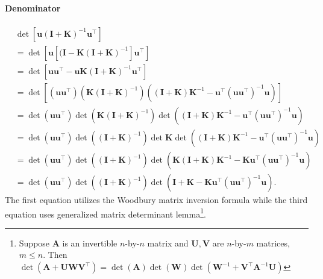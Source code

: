 \paragraph{Denominator}
\begin{align}
&\det[\mathbf{u} (\mathbf{I} + \mathbf{K})^{-1} \mathbf{u}^\top] \nonumber
\\ 
&= \det [\mathbf{u} \left[ (\mathbf{I} - \mathbf{K}(\mathbf{I}+\mathbf{K})^{-1}\right]\mathbf{u}^\top] \nonumber
\\
&=\det [\mathbf{u} \mathbf{u}^\top - \mathbf{u} \mathbf{K}(\mathbf{I}+\mathbf{K})^{-1} \mathbf{u}^\top]  \nonumber
\\
&= \det \left[  (\mathbf{u} \mathbf{u}^\top) \left(\mathbf{K}(\mathbf{I}+\mathbf{K})^{-1}\right) \left( (\mathbf{I} + \mathbf{K}) \mathbf{K}^{-1} - \mathbf{u}^\top (\mathbf{u} \mathbf{u}^\top)^{-1} \mathbf{u}\right) \right] \nonumber
\\
&= \det (\mathbf{u} \mathbf{u}^\top) \det \left(\mathbf{K}(\mathbf{I}+\mathbf{K})^{-1}\right) \det \left( (\mathbf{I} + \mathbf{K}) \mathbf{K}^{-1} - \mathbf{u}^\top (\mathbf{u} \mathbf{u}^\top)^{-1} \mathbf{u}\right) \nonumber 
\\
&= \det (\mathbf{u} \mathbf{u}^\top) \det \left((\mathbf{I}+\mathbf{K})^{-1}\right) \det \mathbf{K} \det \left( (\mathbf{I} + \mathbf{K}) \mathbf{K}^{-1} - \mathbf{u}^\top (\mathbf{u} \mathbf{u}^\top)^{-1} \mathbf{u}\right) \nonumber 
\\
& = \det (\mathbf{u} \mathbf{u}^\top) \det \left((\mathbf{I}+\mathbf{K})^{-1}\right) \det \left( \mathbf{K}(\mathbf{I} + \mathbf{K}) \mathbf{K}^{-1} - \mathbf{K}\mathbf{u}^\top (\mathbf{u} \mathbf{u}^\top)^{-1} \mathbf{u}\right)  \label{Eqn:u_K_inv_uT}
\\
& = \det (\mathbf{u} \mathbf{u}^\top) \det \left((\mathbf{I}+\mathbf{K})^{-1}\right) \det \left(\mathbf{I} + \mathbf{K} - \mathbf{K}\mathbf{u}^\top (\mathbf{u} \mathbf{u}^\top)^{-1} \mathbf{u}\right). \nonumber
\end{align}
The first equation utilizes the Woodbury matrix inversion formula while the third equation uses generalized matrix determinant lemma\footnote{Suppose $\mathbf{A}$ is an invertible $n$-by-$n$ matrix and $\mathbf{U}, \mathbf{V}$ are $n$-by-$m$ matrices, $m \le n$. Then $\det(\mathbf{A} + \mathbf{U}\mathbf{W}\mathbf{V}^\top) = \det(\mathbf{A}) \det(\mathbf{W})\det(\mathbf{W}^{-1} + \mathbf{V}^\top \mathbf{A}^{-1} \mathbf{U})$}.

